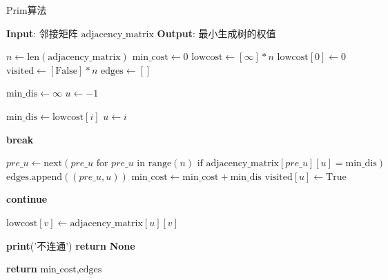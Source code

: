 \documentclass[lang=cn,11pt,a4paper]{elegantpaper}
\begin{document}
\begin{algorithm}[H]
\caption{Prim算法}
\begin{algorithmic}[1]
        \State \textbf{Input}: 邻接矩阵 $\text{adjacency\_matrix}$
        \State \textbf{Output}: 最小生成树的权值
        
        \State $n \gets \text{len}(\text{adjacency\_matrix})$
        \State $\text{min\_cost} \gets 0$
        \State $\text{lowcost} \gets [\infty] * n$
        \State $\text{lowcost}[0] \gets 0$
        \State $\text{visited} \gets [\text{False}] * n$
        \State $\text{edges} \gets []$ 
        
            \State $\text{min\_dis} \gets \infty$
            \State $u \gets -1$
            
                    \State $\text{min\_dis} \gets \text{lowcost}[i]$
                    \State $u \gets i$
                \EndIf
            \EndFor
            
                \State \textbf{break}
            \EndIf
            
            \State $pre\_u \gets \text{next}(pre\_u \text{ for } pre\_u \text{ in range}(n) \text{ if } \text{adjacency\_matrix}[pre\_u][u] = \text{min\_dis})$
            \State $\text{edges.append}((pre\_u, u))$
            \State $\text{min\_cost} \gets \text{min\_cost} + \text{min\_dis}$
            \State $\text{visited}[u] \gets \text{True}$
            
                    \State \textbf{continue}
                \EndIf
                
                    \State $\text{lowcost}[v] \gets \text{adjacency\_matrix}[u][v]$
                \EndIf
            \EndFor
        \EndFor
        
            \State \textbf{print}('不连通')
            \State \textbf{return} \textbf{None}
        \EndIf
        
        \State \textbf{return} $\text{min\_cost}, \text{edges}$
    \EndFunction
\end{algorithmic}
\end{algorithm}
\end{document}
